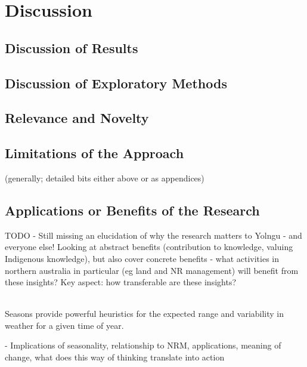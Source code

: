 \chapter{Discussion}
\label{ch:discussion}

\section{Discussion of Results}
\label{sec:disc-results}




\section{Discussion of Exploratory Methods}
\label{sec:disc-methods}




\section{Relevance and Novelty}
\label{sec:disc-rel-novelty}




\section{Limitations of the Approach}
\label{sec:disc-limitations}
(generally; detailed bits either above or as appendices)



\section{Applications or Benefits of the Research}
\label{sec:applications-benefits}
TODO - Still missing an elucidation of why the research matters to Yolngu -
and everyone else!
Looking at abstract benefits (contribution to knowledge, valuing Indigenous knowledge),
but also cover concrete benefits - what activities in northern australia
in particular (eg land and NR management) will benefit from these insights?
Key aspect: how transferable are these insights?

~\\

Seasons provide powerful heuristics for the expected range and variability in
weather for a given time of year.

-	Implications of seasonality, relationship to NRM, applications, meaning of
change, what does this way of thinking translate into action


